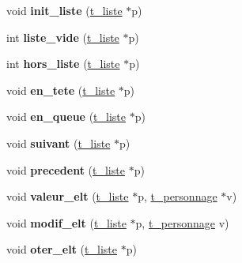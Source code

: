 \begin{DoxyCompactItemize}
\item 
void {\bfseries init\+\_\+liste} (\hyperlink{a00007}{t\+\_\+liste} $\ast$p)\hypertarget{a00025_ae54cf55c0d15211e5433ce9b5abf099d}{}\label{a00025_ae54cf55c0d15211e5433ce9b5abf099d}

\item 
int {\bfseries liste\+\_\+vide} (\hyperlink{a00007}{t\+\_\+liste} $\ast$p)\hypertarget{a00025_ae25051845f03a0ee659aed8e855dad5b}{}\label{a00025_ae25051845f03a0ee659aed8e855dad5b}

\item 
int {\bfseries hors\+\_\+liste} (\hyperlink{a00007}{t\+\_\+liste} $\ast$p)\hypertarget{a00025_aa42eefd0ac04de255ffb11f5e9fdabd6}{}\label{a00025_aa42eefd0ac04de255ffb11f5e9fdabd6}

\item 
void {\bfseries en\+\_\+tete} (\hyperlink{a00007}{t\+\_\+liste} $\ast$p)\hypertarget{a00025_a9a2af94927570339b5708b99c4831cf3}{}\label{a00025_a9a2af94927570339b5708b99c4831cf3}

\item 
void {\bfseries en\+\_\+queue} (\hyperlink{a00007}{t\+\_\+liste} $\ast$p)\hypertarget{a00025_a182d1a7bdc30807ebdd00d566994548d}{}\label{a00025_a182d1a7bdc30807ebdd00d566994548d}

\item 
void {\bfseries suivant} (\hyperlink{a00007}{t\+\_\+liste} $\ast$p)\hypertarget{a00025_ac95aadbae271f7e76ca486b6187dd8dd}{}\label{a00025_ac95aadbae271f7e76ca486b6187dd8dd}

\item 
void {\bfseries precedent} (\hyperlink{a00007}{t\+\_\+liste} $\ast$p)\hypertarget{a00025_a580b4a7d8c45590284303c3d1103a3e3}{}\label{a00025_a580b4a7d8c45590284303c3d1103a3e3}

\item 
void {\bfseries valeur\+\_\+elt} (\hyperlink{a00007}{t\+\_\+liste} $\ast$p, \hyperlink{a00010}{t\+\_\+personnage} $\ast$v)\hypertarget{a00025_ac7ee699d71e8dda4e6f64a30fc487a4a}{}\label{a00025_ac7ee699d71e8dda4e6f64a30fc487a4a}

\item 
void {\bfseries modif\+\_\+elt} (\hyperlink{a00007}{t\+\_\+liste} $\ast$p, \hyperlink{a00010}{t\+\_\+personnage} v)\hypertarget{a00025_a85cff63c489af0391880672f3c039e47}{}\label{a00025_a85cff63c489af0391880672f3c039e47}

\item 
void {\bfseries oter\+\_\+elt} (\hyperlink{a00007}{t\+\_\+liste} $\ast$p)\hypertarget{a00025_a405c291cfedcbb6077322f032ac99fb3}{}\label{a00025_a405c291cfedcbb6077322f032ac99fb3}


\end{DoxyCompactItemize}
